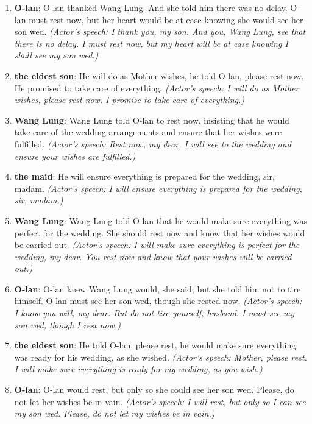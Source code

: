 \documentclass[10pt]{article}
\begin{document}
\begin{enumerate}
\item \textbf{O-lan}: O-lan thanked Wang Lung. And she told him there was no delay. O-lan must rest now, but her heart would be at ease knowing she would see her son wed. \emph{(Actor's speech: I thank you, my son. And you, Wang Lung, see that there is no delay. I must rest now, but my heart will be at ease knowing I shall see my son wed.)}

\item \textbf{the eldest son}: He will do as Mother wishes, he told O-lan, please rest now. He promised to take care of everything. \emph{(Actor's speech: I will do as Mother wishes, please rest now. I promise to take care of everything.)}

\item \textbf{Wang Lung}: Wang Lung told O-lan to rest now, insisting that he would take care of the wedding arrangements and ensure that her wishes were fulfilled. \emph{(Actor's speech: Rest now, my dear. I will see to the wedding and ensure your wishes are fulfilled.)}

\item \textbf{the maid}: He will ensure everything is prepared for the wedding, sir, madam. \emph{(Actor's speech: I will ensure everything is prepared for the wedding, sir, madam.)}

\item \textbf{Wang Lung}: Wang Lung told O-lan that he would make sure everything was perfect for the wedding. She should rest now and know that her wishes would be carried out. \emph{(Actor's speech: I will make sure everything is perfect for the wedding, my dear. You rest now and know that your wishes will be carried out.)}

\item \textbf{O-lan}: O-lan knew Wang Lung would, she said, but she told him not to tire himself. O-lan must see her son wed, though she rested now. \emph{(Actor's speech: I know you will, my dear. But do not tire yourself, husband. I must see my son wed, though I rest now.)}

\item \textbf{the eldest son}: He told O-lan, please rest, he would make sure everything was ready for his wedding, as she wished. \emph{(Actor's speech: Mother, please rest. I will make sure everything is ready for my wedding, as you wish.)}

\item \textbf{O-lan}: O-lan would rest, but only so she could see her son wed. Please, do not let her wishes be in vain. \emph{(Actor's speech: I will rest, but only so I can see my son wed. Please, do not let my wishes be in vain.)}


\end{enumerate}
\end{document}
